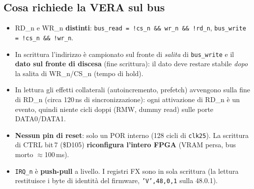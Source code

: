 \documentclass[12pt, a4paper]{article}
\begin{document}
\subsection*{Cosa richiede la VERA sul bus}
\begin{itemize}
  \item RD\_n e WR\_n \textbf{distinti}: \texttt{bus\_read = !cs\_n \&\& wr\_n \&\& !rd\_n}, \texttt{bus\_write = !cs\_n \&\& !wr\_n}.
  \item In scrittura l'indirizzo è campionato sul fronte di \emph{salita} di \texttt{bus\_write} e il \textbf{dato sul fronte di discesa} (fine scrittura): il dato deve restare stabile \emph{dopo} la salita di WR\_n/CS\_n (tempo di hold).
  \item In lettura gli effetti collaterali (autoincremento, prefetch) avvengono sulla fine di RD\_n (circa 120\,ns di sincronizzazione): ogni attivazione di RD\_n è un evento, quindi niente cicli doppi (RMW, dummy read) sulle porte DATA0/DATA1.
  \item \textbf{Nessun pin di reset}: solo un POR interno (128 cicli di \texttt{clk25}). La scrittura di CTRL bit\,7 (\$D105) \textbf{riconfigura l'intero FPGA} (VRAM persa, bus morto $\approx$100\,ms).
  \item \texttt{IRQ\_n} è \textbf{push-pull} a livello. I registri FX sono in sola scrittura (la lettura restituisce i byte di identità del firmware, \texttt{'V',48,0,1} sulla 48.0.1).
\end{itemize}
\end{document}
